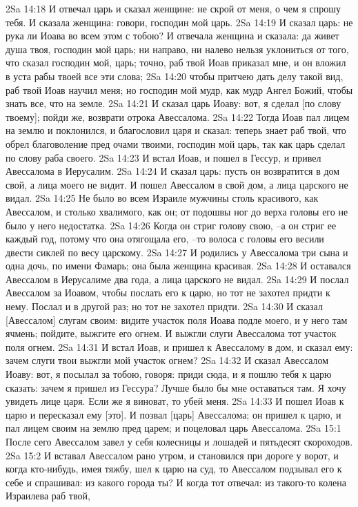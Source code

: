 2Sa 14:18  И отвечал царь и сказал женщине: не скрой от меня, о чем я спрошу тебя. И сказала женщина: говори, господин мой царь.
2Sa 14:19  И сказал царь: не рука ли Иоава во всем этом с тобою? И отвечала женщина и сказала: да живет душа твоя, господин мой царь; ни направо, ни налево нельзя уклониться от того, что сказал господин мой, царь; точно, раб твой Иоав приказал мне, и он вложил в уста рабы твоей все эти слова;
2Sa 14:20  чтобы притчею дать делу такой вид, раб твой Иоав научил меня; но господин мой мудр, как мудр Ангел Божий, чтобы знать все, что на земле.
2Sa 14:21  И сказал царь Иоаву: вот, я сделал [по слову твоему]; пойди же, возврати отрока Авессалома.
2Sa 14:22  Тогда Иоав пал лицем на землю и поклонился, и благословил царя и сказал: теперь знает раб твой, что обрел благоволение пред очами твоими, господин мой царь, так как царь сделал по слову раба своего.
2Sa 14:23  И встал Иоав, и пошел в Гессур, и привел Авессалома в Иерусалим.
2Sa 14:24  И сказал царь: пусть он возвратится в дом свой, а лица моего не видит. И пошел Авессалом в свой дом, а лица царского не видал.
2Sa 14:25  Не было во всем Израиле мужчины столь красивого, как Авессалом, и столько хвалимого, как он; от подошвы ног до верха головы его не было у него недостатка.
2Sa 14:26  Когда он стриг голову свою, --а он стриг ее каждый год, потому что она отягощала его, --то волоса с головы его весили двести сиклей по весу царскому.
2Sa 14:27  И родились у Авессалома три сына и одна дочь, по имени Фамарь; она была женщина красивая.
2Sa 14:28  И оставался Авессалом в Иерусалиме два года, а лица царского не видал.
2Sa 14:29  И послал Авессалом за Иоавом, чтобы послать его к царю, но тот не захотел придти к нему. Послал и в другой раз; но тот не захотел придти.
2Sa 14:30  И сказал [Авессалом] слугам своим: видите участок поля Иоава подле моего, и у него там ячмень; пойдите, выжгите его огнем. И выжгли слуги Авессалома тот участок поля огнем.
2Sa 14:31  И встал Иоав, и пришел к Авессалому в дом, и сказал ему: зачем слуги твои выжгли мой участок огнем?
2Sa 14:32  И сказал Авессалом Иоаву: вот, я посылал за тобою, говоря: приди сюда, и я пошлю тебя к царю сказать: зачем я пришел из Гессура? Лучше было бы мне оставаться там. Я хочу увидеть лице царя. Если же я виноват, то убей меня.
2Sa 14:33  И пошел Иоав к царю и пересказал ему [это]. И позвал [царь] Авессалома; он пришел к царю, и пал лицем своим на землю пред царем; и поцеловал царь Авессалома.
2Sa 15:1  После сего Авессалом завел у себя колесницы и лошадей и пятьдесят скороходов.
2Sa 15:2  И вставал Авессалом рано утром, и становился при дороге у ворот, и когда кто-нибудь, имея тяжбу, шел к царю на суд, то Авессалом подзывал его к себе и спрашивал: из какого города ты? И когда тот отвечал: из такого-то колена Израилева раб твой,
